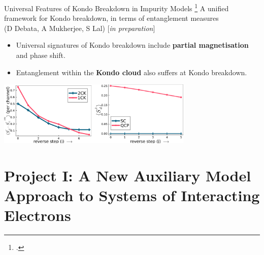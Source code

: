 \documentclass[11pt,aspectratio=169]{beamer}
\newcommand\focus[1]{%
	{\alert{\textbf{#1}}}
}
\begin{document}
\begin{frame}{Universal Features of Kondo Breakdown in Impurity Models}
\footcite{Mukherjee_2023,Patra_2023}
\flushleft
\vspace*{-20pt}
A unified framework for Kondo breakdown, in terms of entanglement measures\\
(D Debata, A Mukherjee, S Lal) [{\it in preparation}]\\[10pt]

\begin{itemize}
	\item Universal signatures of Kondo breakdown include \focus{partial magnetisation} and phase shift.
	\item Entanglement within the \focus{Kondo cloud} also suffers at Kondo breakdown.
\end{itemize}

\vspace*{\fill}
\centering
\includegraphics[width=0.7\textwidth]{compensation.pdf}
\end{frame}
	
\section{Project I: A New Auxiliary Model Approach to Systems of Interacting Electrons}
\end{document}

